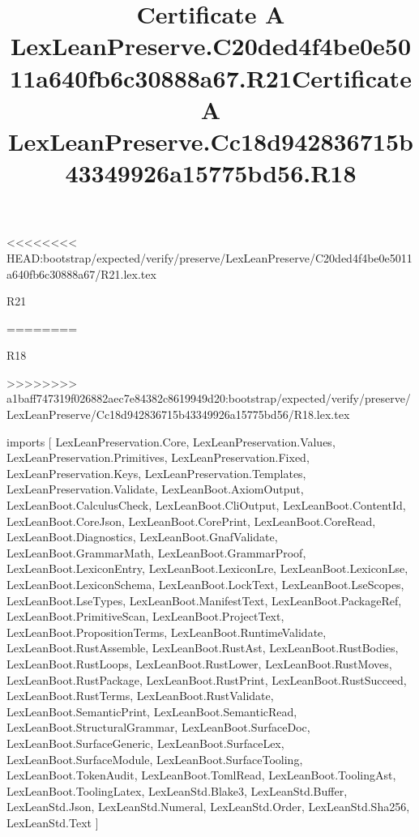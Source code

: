 <<<<<<<< HEAD:bootstrap/expected/verify/preserve/LexLeanPreserve/C20ded4f4be0e5011a640fb6c30888a67/R21.lex.tex
\begin{lexlean}{R21}
\title{Certificate A LexLeanPreserve.C20ded4f4be0e5011a640fb6c30888a67.R21}
========
\begin{lexlean}{R18}
\title{Certificate A LexLeanPreserve.Cc18d942836715b43349926a15775bd56.R18}
>>>>>>>> a1baff747319f026882aec7e84382c8619949d20:bootstrap/expected/verify/preserve/LexLeanPreserve/Cc18d942836715b43349926a15775bd56/R18.lex.tex
\begin{coremodule}
imports [
  LexLeanPreservation.Core,
  LexLeanPreservation.Values,
  LexLeanPreservation.Primitives,
  LexLeanPreservation.Fixed,
  LexLeanPreservation.Keys,
  LexLeanPreservation.Templates,
  LexLeanPreservation.Validate,
  LexLeanBoot.AxiomOutput,
  LexLeanBoot.CalculusCheck,
  LexLeanBoot.CliOutput,
  LexLeanBoot.ContentId,
  LexLeanBoot.CoreJson,
  LexLeanBoot.CorePrint,
  LexLeanBoot.CoreRead,
  LexLeanBoot.Diagnostics,
  LexLeanBoot.GnafValidate,
  LexLeanBoot.GrammarMath,
  LexLeanBoot.GrammarProof,
  LexLeanBoot.LexiconEntry,
  LexLeanBoot.LexiconLre,
  LexLeanBoot.LexiconLse,
  LexLeanBoot.LexiconSchema,
  LexLeanBoot.LockText,
  LexLeanBoot.LseScopes,
  LexLeanBoot.LseTypes,
  LexLeanBoot.ManifestText,
  LexLeanBoot.PackageRef,
  LexLeanBoot.PrimitiveScan,
  LexLeanBoot.ProjectText,
  LexLeanBoot.PropositionTerms,
  LexLeanBoot.RuntimeValidate,
  LexLeanBoot.RustAssemble,
  LexLeanBoot.RustAst,
  LexLeanBoot.RustBodies,
  LexLeanBoot.RustLoops,
  LexLeanBoot.RustLower,
  LexLeanBoot.RustMoves,
  LexLeanBoot.RustPackage,
  LexLeanBoot.RustPrint,
  LexLeanBoot.RustSucceed,
  LexLeanBoot.RustTerms,
  LexLeanBoot.RustValidate,
  LexLeanBoot.SemanticPrint,
  LexLeanBoot.SemanticRead,
  LexLeanBoot.StructuralGrammar,
  LexLeanBoot.SurfaceDoc,
  LexLeanBoot.SurfaceGeneric,
  LexLeanBoot.SurfaceLex,
  LexLeanBoot.SurfaceModule,
  LexLeanBoot.SurfaceTooling,
  LexLeanBoot.TokenAudit,
  LexLeanBoot.TomlRead,
  LexLeanBoot.ToolingAst,
  LexLeanBoot.ToolingLatex,
  LexLeanStd.Blake3,
  LexLeanStd.Buffer,
  LexLeanStd.Json,
  LexLeanStd.Numeral,
  LexLeanStd.Order,
  LexLeanStd.Sha256,
  LexLeanStd.Text
]


\end{coremodule}
\end{lexlean}
\end{lexlean}
